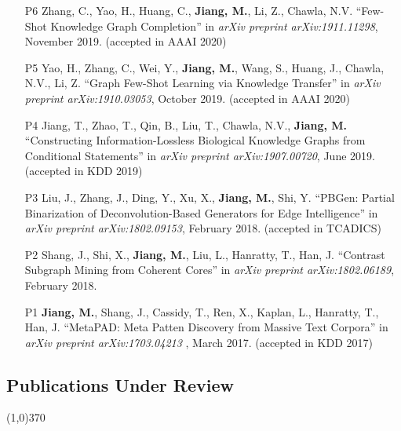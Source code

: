 \documentclass[10pt]{article}
\newenvironment{myindentpar}[1]%
{\begin{list}{}%
         {\setlength{\leftmargin}{#1}}%
         \item[]%
}
{\end{list}}
\newcounter{list}
\begin{document}
\begin{myindentpar}{0.00cm}
{\begin{enumerate}[leftmargin=.5cm]
\item[P6] Zhang, C., Yao, H., Huang, C., \textbf{Jiang, M.}, Li, Z., Chawla, N.V. ``Few-Shot Knowledge Graph Completion'' in \textit{arXiv preprint arXiv:1911.11298}, November 2019. (accepted in AAAI 2020)

\item[P5] Yao, H., Zhang, C., Wei, Y., \textbf{Jiang, M.}, Wang, S., Huang, J., Chawla, N.V., Li, Z. ``Graph Few-Shot Learning via Knowledge Transfer'' in \textit{arXiv preprint arXiv:1910.03053}, October 2019. (accepted in AAAI 2020)
		
\item[P4] Jiang, T., Zhao, T., Qin, B., Liu, T., Chawla, N.V., \textbf{Jiang, M.} ``Constructing Information-Lossless Biological Knowledge Graphs from Conditional Statements'' in \textit{arXiv preprint arXiv:1907.00720}, June 2019. (accepted in KDD 2019)
		
\item[P3] Liu, J., Zhang, J., Ding, Y., Xu, X., \textbf{Jiang, M.}, Shi, Y. ``PBGen: Partial Binarization of Deconvolution-Based Generators for Edge Intelligence'' in \textit{arXiv preprint arXiv:1802.09153}, February 2018. (accepted in TCADICS)
		
\item[P2] Shang, J., Shi, X., \textbf{Jiang, M.}, Liu, L., Hanratty, T., Han, J. ``Contrast Subgraph Mining from Coherent Cores'' in \textit{arXiv preprint arXiv:1802.06189}, February 2018.

\item[P1] \textbf{Jiang, M.}, Shang, J., Cassidy, T., Ren, X., Kaplan, L., Hanratty, T., Han, J. ``MetaPAD: Meta Patten Discovery from Massive Text Corpora'' in \textit{arXiv preprint arXiv:1703.04213 }, March 2017. (accepted in KDD 2017)

\end{enumerate}
}

\end{myindentpar}

\subsection{\sc Publications Under Review}
\vspace{-0.4cm} \line(1,0){370} \vspace{-0.1cm}
\end{document}
